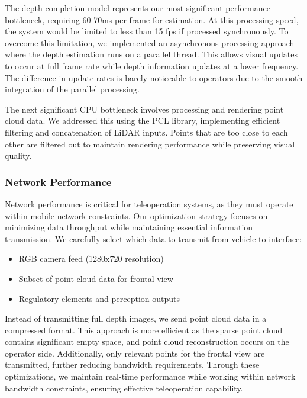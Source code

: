 The depth completion model represents our most significant performance bottleneck, requiring 60-70ms per frame for estimation. At this processing speed, the system would be limited to less than 15 fps if processed synchronously. To overcome this limitation, we implemented an asynchronous processing approach where the depth estimation runs on a parallel thread. This allows visual updates to occur at full frame rate while depth information updates at a lower frequency. The difference in update rates is barely noticeable to operators due to the smooth integration of the parallel processing.

The next significant CPU bottleneck involves processing and rendering point cloud data. We addressed this using the PCL library, implementing efficient filtering and concatenation of LiDAR inputs. Points that are too close to each other are filtered out to maintain rendering performance while preserving visual quality.

\subsubsection{Network Performance}
Network performance is critical for teleoperation systems, as they must operate within mobile network constraints. Our optimization strategy focuses on minimizing data throughput while maintaining essential information transmission.
We carefully select which data to transmit from vehicle to interface:
\begin{itemize}
\item RGB camera feed (1280x720 resolution)
\item Subset of point cloud data for frontal view
\item Regulatory elements and perception outputs
\end{itemize}
Instead of transmitting full depth images, we send point cloud data in a compressed format. This approach is more efficient as the sparse point cloud contains significant empty space, and point cloud reconstruction occurs on the operator side. Additionally, only relevant points for the frontal view are transmitted, further reducing bandwidth requirements.
Through these optimizations, we maintain real-time performance while working within network bandwidth constraints, ensuring effective teleoperation capability.